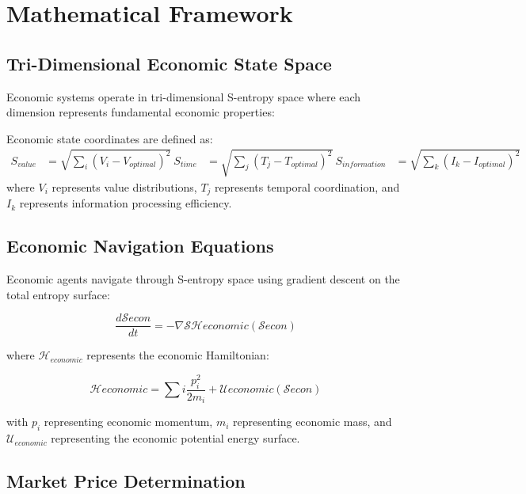 \section{Mathematical Framework}

\subsection{Tri-Dimensional Economic State Space}

Economic systems operate in tri-dimensional S-entropy space where each dimension represents fundamental economic properties:

\begin{definition}
Economic state coordinates are defined as:
\begin{align}
S_{value} &= \sqrt{\sum_{i} (V_i - V_{optimal})^2} \
S_{time} &= \sqrt{\sum_{j} (T_j - T_{optimal})^2} \
S_{information} &= \sqrt{\sum_{k} (I_k - I_{optimal})^2}
\end{align}
where $V_i$ represents value distributions, $T_j$ represents temporal coordination, and $I_k$ represents information processing efficiency.
\end{definition}

\subsection{Economic Navigation Equations}

Economic agents navigate through S-entropy space using gradient descent on the total entropy surface:

\begin{equation}
\frac{d\mathcal{S}{econ}}{dt} = -\nabla{\mathcal{S}} \mathcal{H}{economic}(\mathcal{S}{econ})
\end{equation}

where $\mathcal{H}_{economic}$ represents the economic Hamiltonian:

\begin{equation}
\mathcal{H}{economic} = \sum{i} \frac{p_i^2}{2m_i} + \mathcal{U}{economic}(\mathcal{S}{econ})
\end{equation}

with $p_i$ representing economic momentum, $m_i$ representing economic mass, and $\mathcal{U}_{economic}$ representing the economic potential energy surface.

\subsection{Market Price Determination}


